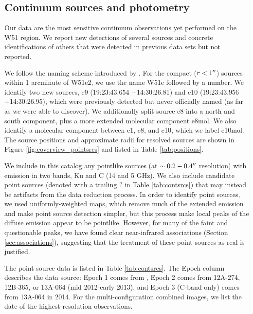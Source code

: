 \subsection{Continuum sources and photometry}
\label{sec:pointsources}
Our data are the most sensitive continuum observations yet performed on the W51
region.  We report new detections of several sources and concrete
identifications of others that were detected in previous data sets but not
reported.

We follow the naming scheme introduced by \citet{Mehringer1994a}.  For the
compact ($r<1\mbox{$^{\prime\prime}$}$) sources within 1 arcminute of W51e2, we use the name
W51e followed by a number.  We identify two new sources, e9 (19:23:43.654
+14:30:26.81) and e10 (19:23:43.956 +14:30:26.95), which were previously
detected but never officially named (as far as we were able to discover).
We additionally split source e8 into a north and south component, plus a more
extended molecular component e8mol.  We also identify a molecular component
between e1, e8, and e10, which we label e10mol.  The source positions
and approximate radii for resolved sources are shown in Figure
\ref{fig:coverview_pointsrcs} and listed in Table \ref{tab:positions}.



We include in this catalog any pointlike sources (at $\sim0.2-0.4\mbox{$^{\prime\prime}$}$
resolution) with emission in two bands, Ku and C (14 and 5 GHz).  We also
include candidate point sources (denoted with a trailing ? in Table
\ref{tab:contsrcs}) that may instead be artifacts from the data reduction
process.  In order to identify point sources, we used
uniformly-weighted maps, which remove much of the extended emission and make
point source detection simpler, but this process make local peaks
of the diffuse emission appear to be pointlike.  However, for many of the
faint and questionable peaks, we have found clear near-infrared associations
(Section \ref{sec:associations}),
suggesting that the treatment of these point sources as real is justified.

The point source data is listed in Table \ref{tab:contsrcs}.  The Epoch column
describes the data source: Epoch 1 comes from \citet{Mehringer1994a}, Epoch 2
comes from 12A-274, 12B-365, or 13A-064 (mid 2012-early
2013), and Epoch 3 (C-band only) comes from
13A-064 in 2014. For the multi-configuration combined images, we list the date
of the highest-resolution observations.

